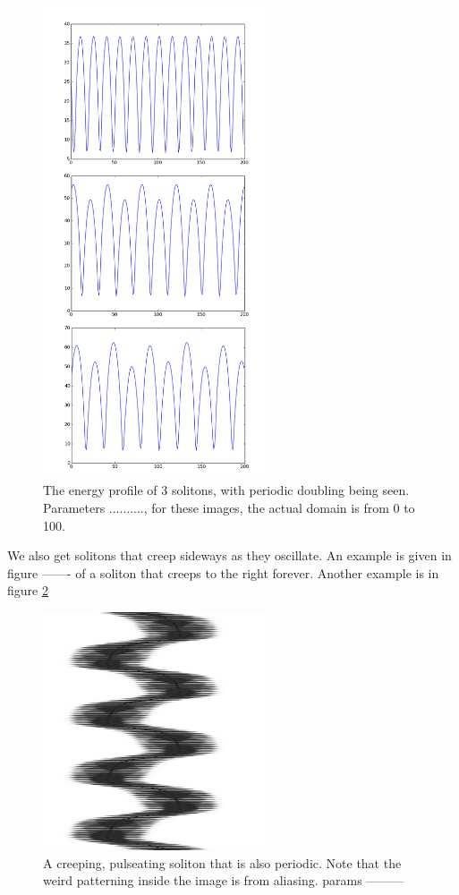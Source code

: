 \documentclass[a4paper,12pt]{report}
\begin{document}
\begin{figure}[h]
\centering
\includegraphics[width=2.6in]{periodic_doubling}
\caption{The energy profile of 3 solitons, with periodic doubling being seen. Parameters .........., for these images, the actual domain is from 0 to 100.}
\label{highamp} 
\end{figure}

We also get solitons that creep sideways as they oscillate.
An example is given in figure ------- of a soliton that creeps to the right forever. Another example is in figure \ref{periodpulse} 
\begin{figure}[h]
\centering
\includegraphics[width=2.6in]{periodpulse}
\caption{A creeping, pulseating soliton that is also periodic. Note that the weird patterning inside the image is from aliasing. params ---------}
\label{periodpulse} 
\end{figure}
\end{document}
